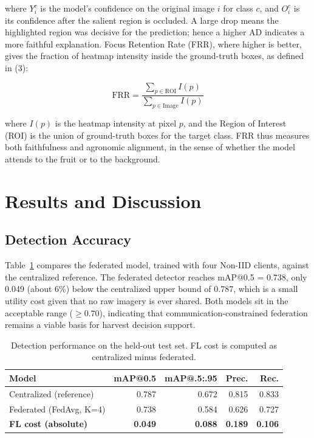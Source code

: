 \documentclass[9pt,twocolumn]{extarticle}
\begin{document}
where $Y_i^c$ is the model's confidence on the original image $i$ for class $c$, and $O_i^c$ is its confidence after the salient region is occluded. A large drop means the highlighted region was decisive for the prediction; hence a higher AD indicates a more faithful explanation. Focus Retention Rate (FRR), where higher is better, gives the fraction of heatmap intensity inside the ground-truth boxes, as defined in (3):

\begin{equation}
\text{FRR} = \frac{\sum_{p \in \text{ROI}} I(p)}{\sum_{p \in \text{Image}} I(p)}
\label{eq:frr}
\end{equation}

where $I(p)$ is the heatmap intensity at pixel $p$, and the Region of Interest (ROI) is the union of ground-truth boxes for the target class. FRR thus measures both faithfulness and agronomic alignment, in the sense of whether the model attends to the fruit or to the background.

\section{Results and Discussion}

\subsection{Detection Accuracy}

Table~\ref{tab:accuracy} compares the federated model, trained with four Non-IID clients, against the centralized reference. The federated detector reaches mAP@0.5 = 0.738, only 0.049 (about 6\%) below the centralized upper bound of 0.787, which is a small utility cost given that no raw imagery is ever shared. Both models sit in the acceptable range ($\geq 0.70$), indicating that communication-constrained federation remains a viable basis for harvest decision support.

\begin{table}[H]
  \centering
  \caption{Detection performance on the held-out test set. FL cost is computed as centralized minus federated.}
  \label{tab:accuracy}
  \small
  \begin{tabular}{lrrrr}
    \toprule
    Model & mAP@0.5 & mAP@.5:.95 & Prec. & Rec. \\
    \midrule
    Centralized (reference) & 0.787 & 0.672 & 0.815 & 0.833 \\
    Federated (FedAvg, K=4) & 0.738 & 0.584 & 0.626 & 0.727 \\
    \midrule
    \textbf{FL cost (absolute)} & \textbf{0.049} & \textbf{0.088} & \textbf{0.189} & \textbf{0.106} \\
    \bottomrule
  \end{tabular}
\end{table}
\end{document}
